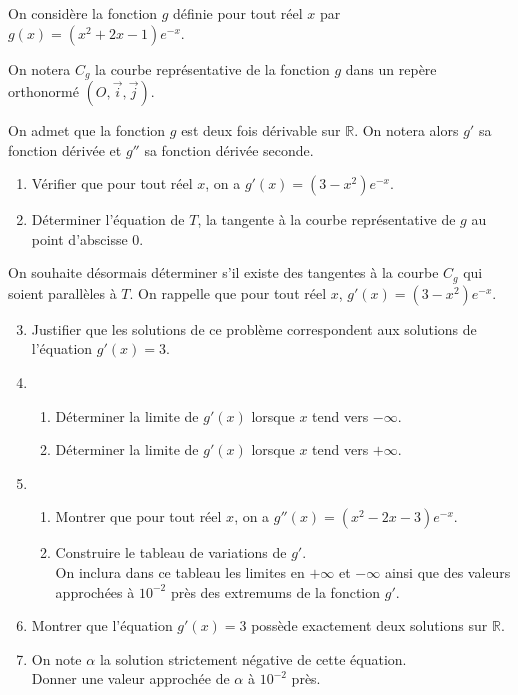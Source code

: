 \documentclass[11pt,fleqn, openany]{book} %
\begin{document}
\begin{exercise}
On considère la fonction $g$ définie pour tout réel $x$ par $g(x)=(x^2+2x-1)e^{-x}$.

On notera $C_g$ la courbe représentative de la fonction $g$ dans un repère orthonormé $(O, \vec i, \vec j)$.

On admet que la fonction $g$ est deux fois dérivable sur $\mathbb{R}$. On notera alors $g'$ sa fonction dérivée et $g''$ sa fonction dérivée seconde.

\begin{enumerate}
\item Vérifier que pour tout réel $x$, on a $g'(x)=(3-x^2)e^{-x}$.
\vskip5pt
\item Déterminer l'équation de $T$, la tangente à la courbe représentative de $g$ au point d'abscisse 0.
\end{enumerate}

On souhaite désormais déterminer s'il existe des tangentes à la courbe $C_g$ qui soient parallèles à $T$. On rappelle que pour tout réel $x$, $g'(x)=(3-x^2)e^{-x}$.
\begin{enumerate}
\setcounter{enumi}{2}
\item Justifier que les solutions de ce problème correspondent aux solutions de l'équation $g'(x)=3$.
\vskip5pt
\item \begin{enumerate}
\item Déterminer la limite de $g'(x)$ lorsque $x$ tend vers $-\infty$.
\item Déterminer la limite de $g'(x)$ lorsque $x$ tend vers $+\infty$.
\end{enumerate}
\vskip5pt
\item \begin{enumerate}
\item Montrer que pour tout réel $x$, on a $g''(x)=(x^2-2x-3)e^{-x}$.
\item Construire le tableau de variations de $g'$. \\On inclura dans ce tableau les limites en $+\infty$ et $-\infty$ ainsi que des valeurs approchées à $10^{-2}$ près des extremums de la fonction $g'$.
\end{enumerate}
\vskip5pt
\item Montrer que l'équation $g'(x)=3$ possède exactement deux solutions sur $\mathbb{R}$. 
\vskip5pt
\item On note $\alpha$ la solution strictement négative de cette équation.\\ Donner une valeur approchée de $\alpha$ à $10^{-2}$ près.
\end{enumerate}
\end{exercise}
\end{document}
